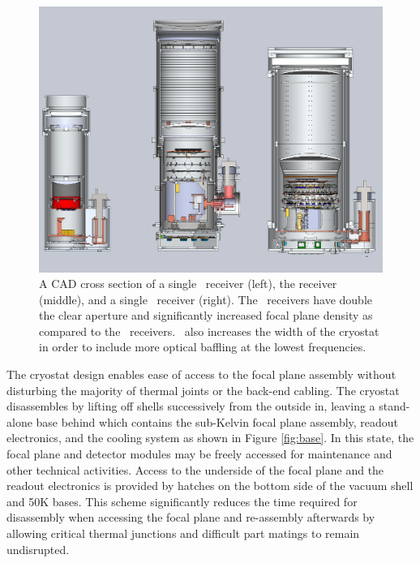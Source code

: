 \documentclass[]{spie}  %
\begin{document}
\begin{figure} [hb]
	\begin{center}
		\includegraphics[scale=0.35]{BA_B3_spud.PDF}
	\end{center}
	\caption{A CAD cross section of a single \keckarray\ receiver (left), the
	 receiver (middle), and a single
	\biceparray\ receiver (right). The \biceparray\ receivers have double
	the clear aperture and significantly increased focal plane density as
	compared to the \keckarray\ receivers. \biceparray\ also increases the
	width of the cryostat in order to include more optical baffling at the
	lowest frequencies.}
	\label{fig:bavskeck}
\end{figure}







The cryostat design enables ease of access to the focal plane assembly without
disturbing the majority of thermal joints or the back-end cabling. The
cryostat disassembles by lifting off shells successively
from the outside in, leaving a stand-alone base behind which contains the
sub-Kelvin focal plane assembly, readout electronics, and the cooling system as shown in Figure
\ref{fig:base}. In this state, the focal plane and detector modules may be
freely accessed for maintenance and other technical activities. Access to the
underside of the focal plane and the readout electronics is provided by
hatches on the bottom side of the vacuum shell and 50K bases. This scheme
significantly reduces the time required for disassembly when accessing the
focal plane and re-assembly afterwards by allowing critical thermal junctions
and difficult part matings to remain undisrupted.
\end{document}
